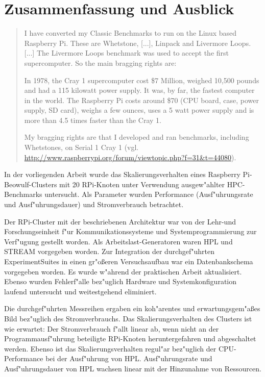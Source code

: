 \chapter{Zusammenfassung und Ausblick}\label{Kap5}
\begin{quote}
\onehalfspacing
I have converted my Classic Benchmarks to run on the Linux based Raspberry Pi. These are Whetstone, [...], Linpack and Livermore Loops. [...] The Livermore Loops benchmark was used to accept the first supercomputer. So the main bragging rights are:

In 1978, the Cray 1 supercomputer cost \$7 Million, weighed 10,500 pounds and had a 115 kilowatt power supply. It was, by far, the fastest computer in the world. The Raspberry Pi costs around \$70 (CPU board, case, power supply, SD card), weighs a few ounces, uses a 5 watt power supply and is more than 4.5 times faster than the Cray 1. 

My bragging rights are that I developed and ran benchmarks, including Whetstones, on Serial 1 Cray 1 (vgl. \url{http://www.raspberrypi.org/forum/viewtopic.php?f=31&t=44080}).
\end{quote}
In der vorliegenden Arbeit wurde das Skalierungsverhalten eines Raspberry Pi-Beowulf-Clusters mit 20 RPi-Knoten unter Verwendung ausgew"ahlter HPC-Benchmarks untersucht. Als Parameter wurden Performance (Ausf"uhrungsrate und Ausf"uhrungsdauer) und Stromverbrauch betrachtet. 

Der RPi-Cluster mit der beschriebenen Architektur war von der Lehr-und Forschungseinheit f"ur Kommunikationssysteme und Systemprogrammierung zur Verf"ugung gestellt worden. Als Arbeitslast-Generatoren waren HPL und STREAM vorgegeben worden. Zur Integration der durchgef"uhrten ExperimentSuites in einen gr"o\ss eren Versuchsaufbau war ein Datenbankschema vorgegeben worden. Es wurde w"ahrend der praktischen Arbeit aktualisiert. Ebenso wurden Fehlerf"alle bez"uglich Hardware und Systemkonfiguration laufend untersucht und weitestgehend eliminiert. 

Die durchgef"uhrten Messreihen ergaben ein koh"arentes und erwartungsgem"a\ss es Bild be\-z"ug\-lich des Stromverbrauchs. Das Skalierungsverhalten des Clusters ist wie erwartet: Der Stromverbrauch f"allt linear ab, wenn nicht an der Programmausf"uhrung beteiligte RPi-Knoten heruntergefahren und abgeschaltet werden. Ebenso ist das Skalierungsverhalten regul"ar bez"uglich der CPU-Performance bei der Ausf"uhrung von HPL. Ausf"uhrungsrate und Ausf"uhrungsdauer von HPL wachsen linear mit der Hinzunahme von Ressourcen. 

